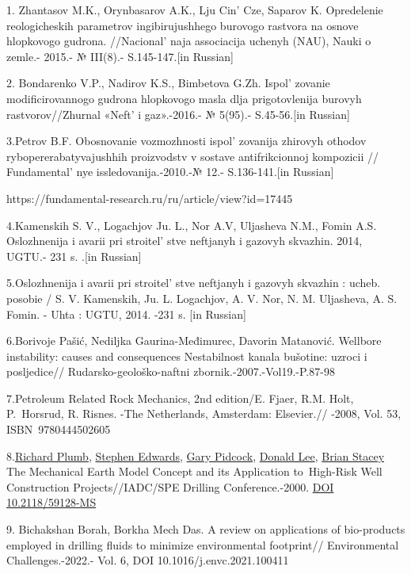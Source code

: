 \begin{references}

1. Zhantasov M.K., Orynbasarov A.K., Lju Cin'{} Cze,
Saparov K. Opredelenie reologicheskih parametrov ingibirujushhego
burovogo rastvora na osnove hlopkovogo gudrona.
//Nacional' naja associacija uchenyh (NAU), Nauki o
zemle.- 2015.- № III(8).- S.145-147.{[}in Russian{]}

2. Bondarenko V.P., Nadirov K.S., Bimbetova G.Zh.
Ispol' zovanie modificirovannogo gudrona hlopkovogo masla
dlja prigotovlenija burovyh rastvorov//Zhurnal «Neft'{} i
gaz».-2016.- № 5(95).- S.45-56.{[}in Russian{]}

3.Petrov B.F. Obosnovanie vozmozhnosti ispol' zovanija
zhirovyh othodov rybopererabatyvajushhih proizvodstv v sostave
antifrikcionnoj kompozicii // Fundamental' nye
issledovanija.-2010.-№ 12.- S.136-141.{[}in Russian{]}

https://fundamental-research.ru/ru/article/view?id=17445

4.Kamenskih S. V., Logachjov Ju. L., Nor A.V, Uljasheva N.M., Fomin A.S.
Oslozhnenija i avarii pri stroitel' stve neftjanyh i
gazovyh skvazhin. 2014, UGTU.- 231 s. .{[}in Russian{]}

5.Oslozhnenija i avarii pri stroitel' stve neftjanyh i
gazovyh skvazhin : ucheb. posobie / S. V. Kamenskih, Ju. L. Logachjov,
A. V. Nor, N. M. Uljasheva, A. S. Fomin. - Uhta : UGTU, 2014. -231 s.
{[}in Russian{]}

6.Borivoje Pašić, Nediljka Gaurina-Međimurec, Davorin Matanović.
Wellbore instability: causes and consequences Nestabilnost kanala
bušotine: uzroci i posljedice// Rudarsko-geološko-naftni
zbornik.-2007.-Vol19.-P.87-98

7.Petroleum Related Rock Mechanics, 2nd edition/E. Fjaer, R.M. Holt,
P.~Horsrud, R. Risnes. -The Netherlands, Amsterdam: Elsevier.// -2008,
Vol. 53, ISBN~9780444502605

8.\href{javascript:;}{Richard Plumb}, \href{javascript:;}{Stephen
Edwards}, \href{javascript:;}{Gary Pidcock}, \href{javascript:;}{Donald
Lee}, \href{javascript:;}{Brian Stacey} The Mechanical Earth Model
Concept and its Application to~High-Risk Well Construction
Projects//IADC/SPE Drilling Conference.-2000.
\href{https://doi.org/10.2118/59128-MS}{DOI 10.2118/59128-MS}

9. Bichakshan Borah, Borkha Mech Das. A review on applications of
bio-products employed in drilling fluids to minimize environmental
footprint// Environmental Challenges.-2022.- Vol. 6, DOI
10.1016/j.envc.2021.100411


\end{references}
